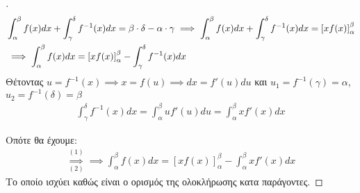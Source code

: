 \setcounter{page}{1}
\setcounter{equation}{0}

\question

\begin{center}
\begin{proof}[\unskip\nopunct]
\begin{align}
    \notag
    &\int_{\alpha}^{\beta}f(x)dx + \int_{\gamma}^{\delta}f^{-1}(x)dx = \beta\cdot\delta - \alpha\cdot\gamma\notag
    \implies \int_{\alpha}^{\beta}f(x)dx + \int_{\gamma}^{\delta}f^{-1}(x)dx = \left[xf(x)\right]_{\alpha}^{\beta}\\
    &\implies \int_{\alpha}^{\beta}f(x)dx = \left[xf(x)\right]_{\alpha}^{\beta} - \int_{\gamma}^{\delta}f^{-1}(x)dx
\end{align}
\textgreek{Θέτοντας $u=f^{-1}(x)\implies x=f(u) \implies dx=f'(u)du$ και $u_1 = f^{-1}(\gamma) = \alpha$, $u_2 = f^{-1}(\delta) = \beta$}
\begin{align}
    \int_{\gamma}^{\delta}f^{-1}(x)dx = \int_{\alpha}^{\beta}uf'(u)du = \int_{\alpha}^{\beta}xf'(x)dx
\end{align}

\textgreek{Οπότε θα έχουμε: }
\begin{align*}
    \underset{\mathrm{(2)}}{\overset{\mathrm{(1)}}{\implies}} \implies \int_{\alpha}^{\beta}f(x)dx = \left[xf(x)\right]_{\alpha}^{\beta} - \int_{\alpha}^{\beta}xf'(x)dx
\end{align*}
\textgreek{Το οποίο ισχύει καθώς είναι ο ορισμός της ολοκλήρωσης κατα παράγοντες.}
\end{proof}

\end{center}